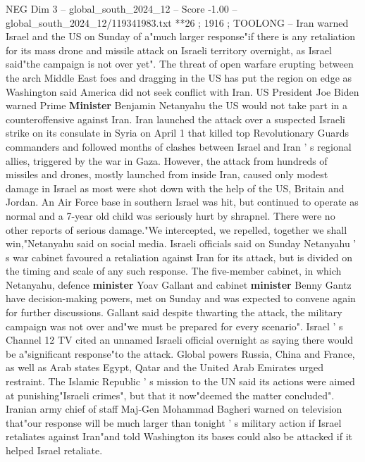\begin{textsample}{NEG Dim 3 – global\_south\_2024\_12 – Score -1.00 – global\_south\_2024\_12/119341983.txt}  \label{ex:f3_neg_065}
**26 ; 1916 ; TOOLONG -- Iran warned Israel and the US on Sunday of a"much larger response"if there is any retaliation for its mass drone and missile attack on Israeli territory overnight, as Israel said"the campaign is not over yet".
The threat of open warfare erupting between the arch Middle East foes and dragging in the US has put the region on edge as Washington said America did not seek conflict with Iran.
US President Joe Biden warned Prime \textbf{Minister} Benjamin Netanyahu the US would not take part in a counteroffensive against Iran.
Iran launched the attack over a suspected Israeli strike on its consulate in Syria on April 1 that killed top Revolutionary Guards commanders and followed months of clashes between Israel and Iran ' s regional allies, triggered by the war in Gaza.
However, the attack from hundreds of missiles and drones, mostly launched from inside Iran, caused only modest damage in Israel as most were shot down with the help of the US, Britain and Jordan.
An Air Force base in southern Israel was hit, but continued to operate as normal and a 7-year old child was seriously hurt by shrapnel.
There were no other reports of serious damage."We intercepted, we repelled, together we shall win,"Netanyahu said on social media.
Israeli officials said on Sunday Netanyahu ' s war cabinet favoured a retaliation against Iran for its attack, but is divided on the timing and scale of any such response.
The five-member cabinet, in which Netanyahu, defence \textbf{minister} Yoav Gallant and cabinet \textbf{minister} Benny Gantz have decision-making powers, met on Sunday and was expected to convene again for further discussions.
Gallant said despite thwarting the attack, the military campaign was not over and"we must be prepared for every scenario".
Israel ' s Channel 12 TV cited an unnamed Israeli official overnight as saying there would be a"significant response"to the attack.
Global powers Russia, China and France, as well as Arab states Egypt, Qatar and the United Arab Emirates urged restraint.
The Islamic Republic ' s mission to the UN said its actions were aimed at punishing"Israeli crimes", but that it now"deemed the matter concluded".
Iranian army chief of staff Maj-Gen Mohammad Bagheri warned on television that"our response will be much larger than tonight ' s military action if Israel retaliates against Iran"and told Washington its bases could also be attacked if it helped Israel retaliate.

\end{textsample}
